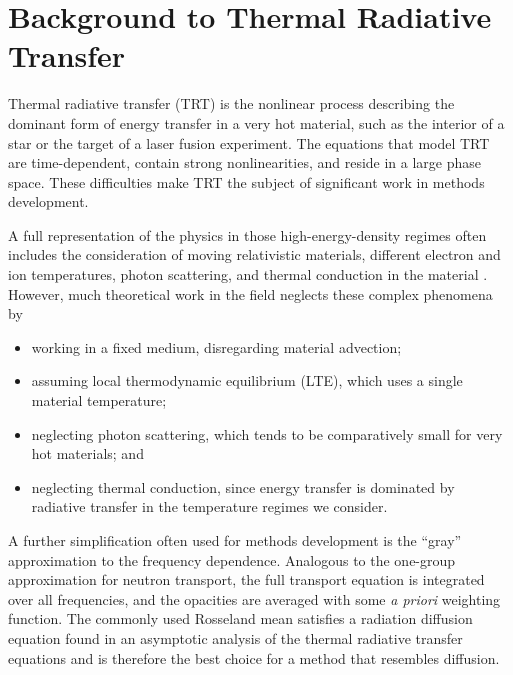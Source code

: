 
\chapter{Background to Thermal Radiative Transfer}\label{chap:trtBackground}

Thermal radiative transfer (TRT) is the nonlinear process describing the
dominant form of energy transfer in a very hot material, such as the interior
of a star or the
target of a laser fusion experiment. The equations that model TRT are
time-dependent, contain strong nonlinearities, and reside in a large phase
space. These difficulties make TRT the subject of significant work in methods
development.

A full representation of the physics in
those high-energy-density regimes often includes the consideration of moving
relativistic materials, different electron and ion temperatures, photon
scattering, and thermal conduction in the material \cite{Mih1984}. However,
much theoretical work in the field neglects these complex phenomena by
\prelistpar
\begin{itemize}
  \item working in a fixed medium, disregarding material advection;
  \item assuming local thermodynamic equilibrium (LTE), which uses a single
    material temperature;
  \item neglecting photon scattering, which tends to be comparatively small for
    very hot materials; and
  \item neglecting thermal conduction, since energy transfer is dominated by
    radiative transfer in the temperature regimes we consider.
\end{itemize}

A further simplification often used for methods development is the ``gray''
approximation to the frequency dependence. Analogous to the one-group
approximation for neutron transport, the full transport equation is integrated
over all frequencies, and the opacities are averaged with some \emph{a priori}
weighting function. The commonly used Rosseland mean satisfies a radiation
diffusion equation found in an asymptotic analysis of the thermal radiative
transfer equations \cite{Lar1983a} and is therefore the best choice for a
method that resembles diffusion.


